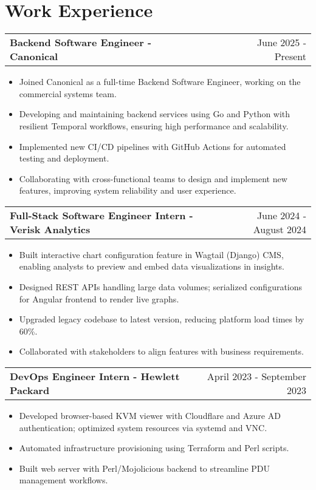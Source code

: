 \documentclass[a4paper,10pt]{article}
\makeatletter
\newenvironment{joblong}[2]
    {
    \begin{tabularx}{\linewidth}{@{}l X r@{}}
    \textbf{#1} & \hfill &  #2 \\[3.75pt]
    \end{tabularx}
    \begin{minipage}[t]{\linewidth}
    \begin{itemize}[nosep,after=\strut, leftmargin=1em, itemsep=3pt,label=--]
    }
    {
    \end{itemize}
    \end{minipage}    
    }
\makeatother
\begin{document}
\section{Work Experience}

\begin{joblong}{Backend Software Engineer - Canonical}{June 2025 - Present}
    \item Joined Canonical as a full-time Backend Software Engineer, working on the commercial systems team.
    \item Developing and maintaining backend services using Go and Python with resilient Temporal workflows, ensuring high performance and scalability.
    \item Implemented new CI/CD pipelines with GitHub Actions for automated testing and deployment.
    \item Collaborating with cross-functional teams to design and implement new features, improving system reliability and user experience.
\end{joblong}

\begin{joblong}{Full-Stack Software Engineer Intern - Verisk Analytics}{June 2024 - August 2024}
    \item Built interactive chart configuration feature in Wagtail (Django) CMS, enabling analysts to preview and embed data visualizations in insights.
    \item Designed REST APIs handling large data volumes; serialized configurations for Angular frontend to render live graphs.
    \item Upgraded legacy codebase to latest version, reducing platform load times by 60\%.
    \item Collaborated with stakeholders to align features with business requirements.
\end{joblong}


\begin{joblong}{DevOps Engineer Intern - Hewlett Packard}{April 2023 - September 2023}
    \item Developed browser-based KVM viewer with Cloudflare and Azure AD authentication; optimized system resources via systemd and VNC.
    \item Automated infrastructure provisioning using Terraform and Perl scripts.
    \item Built web server with Perl/Mojolicious backend to streamline PDU management workflows.
\end{joblong}
\end{document}
